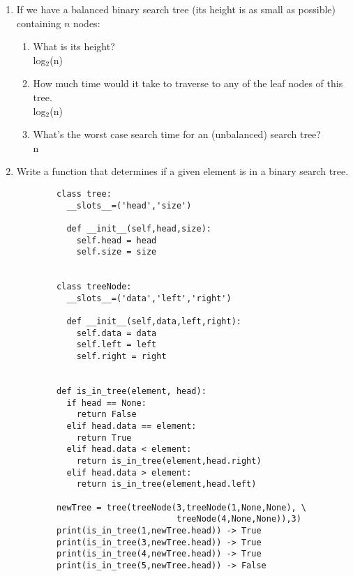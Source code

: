 \documentclass[11pt]{article}
\newenvironment{answer}{\large\lstset{basicstyle=\large}\color{white}}{}
\newenvironment{answer}{\large\lstset{basicstyle=\large}\color{red}}{}
\begin{document}
\begin{enumerate}
\item If we have a balanced binary search tree (its height is as small as
    possible) containing $n$ nodes:
        \begin{enumerate}
            \item What is its height? \\
                \begin{answer}
                log$_2$(n)
                \end{answer}
            \item How much time would it take to traverse to any of the leaf
            nodes of this tree. \\
                \begin{answer}
                log$_2$(n)
                \end{answer}
            \item What's the worst case search time for an (unbalanced) search
            tree? \\
                \begin{answer}
                n
                \end{answer}
                \pagebreak
        \end{enumerate}
    \item Write a function that determines if a given element is in a binary search tree.
        \begin{answer}
        \begin{lstlisting}
        class tree:
          __slots__=('head','size')
  
          def __init__(self,head,size):
            self.head = head
            self.size = size

  
        class treeNode:
          __slots__=('data','left','right')
    
          def __init__(self,data,left,right):
            self.data = data
            self.left = left
            self.right = right


        def is_in_tree(element, head):
          if head == None:
            return False
          elif head.data == element:
            return True
          elif head.data < element:
            return is_in_tree(element,head.right)
          elif head.data > element:
            return is_in_tree(element,head.left)

        newTree = tree(treeNode(3,treeNode(1,None,None), \
                                treeNode(4,None,None)),3)
        print(is_in_tree(1,newTree.head)) -> True
        print(is_in_tree(3,newTree.head)) -> True
        print(is_in_tree(4,newTree.head)) -> True
        print(is_in_tree(5,newTree.head)) -> False
        \end{lstlisting}
        \end{answer}
        \pagebreak

\end{enumerate}
\end{document}
